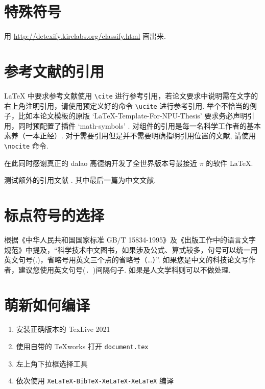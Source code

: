 \section{特殊符号}

用 \href{http://detexify.kirelabs.org/classify.html}{http://detexify.kirelabs.org/classify.html}
画出来.

\section{参考文献的引用}

\LaTeX{} 中要求参考文献使用 \lstinline`\cite` 进行参考引用，若论文要求中说明需在文字的右上角注明引用，请使用预定义好的命令 \lstinline`\ucite` 进行参考引用. 举个不恰当的例子，比如本论文模板的原版 `LaTeX-Template-For-NPU-Thesis'  要求务必声明引用，同时预配置了插件 `math-symbols' . 对组件的引用是每一名科学工作者的基本素养（一本正经）. 对于需要引用但是并不需要明确指明引用位置的文献, 请使用 \lstinline`\nocite` 命令.

在此同时感谢真正的 dalao 高德纳开发了全世界版本号最接近 $\pi$ 的软件 \LaTeX{}\nocite{lamport1989latex}.

测试额外的引用文献 . 其中最后一篇为中文文献.

\section{标点符号的选择}

根据《中华人民共和国国家标准 GB/T 15834-1995》及《出版工作中的语言文字规范》中提及，“科学技术中文图书，如果涉及公式、算式较多，句号可以统一用英文句号(.)，省略号用英文三个点的省略号（…）”. 如果您是中文的科技论文写作者，建议您使用英文句号(\lstinline`. `)间隔句子. 如果是人文学科则可以不做处理.

\section{萌新如何编译}

\begin{enumerate}
    \setlength{\itemsep}{0pt}
    \item 安装正确版本的 TexLive 2021
    \item 使用自带的 TeXworks 打开 \lstinline`document.tex`
    \item 左上角下拉框选择工具
    \item 依次使用 \lstinline`XeLaTeX-BibTeX-XeLaTeX-XeLaTeX` 编译
\end{enumerate}

\endinput
